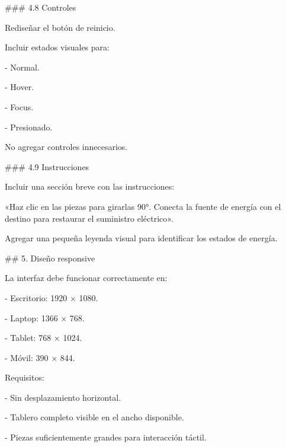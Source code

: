 \noindent \#\#\# 4.8 Controles\par
\par\smallskip
\noindent Rediseñar el botón de reinicio.\par
\par\smallskip
\noindent Incluir estados visuales para:\par
\par\smallskip
\noindent - Normal.\par
\noindent - Hover.\par
\noindent - Focus.\par
\noindent - Presionado.\par
\par\smallskip
\noindent No agregar controles innecesarios.\par
\par\smallskip
\noindent \#\#\# 4.9 Instrucciones\par
\par\smallskip
\noindent Incluir una sección breve con las instrucciones:\par
\par\smallskip
\noindent «Haz clic en las piezas para girarlas 90°. Conecta la fuente de energía con el destino para restaurar el suministro eléctrico».\par
\par\smallskip
\noindent Agregar una pequeña leyenda visual para identificar los estados de energía.\par
\par\smallskip
\noindent \#\# 5. Diseño responsive\par
\par\smallskip
\noindent La interfaz debe funcionar correctamente en:\par
\par\smallskip
\noindent - Escritorio: 1920 × 1080.\par
\noindent - Laptop: 1366 × 768.\par
\noindent - Tablet: 768 × 1024.\par
\noindent - Móvil: 390 × 844.\par
\par\smallskip
\noindent Requisitos:\par
\par\smallskip
\noindent - Sin desplazamiento horizontal.\par
\noindent - Tablero completo visible en el ancho disponible.\par
\noindent - Piezas suficientemente grandes para interacción táctil.\par
